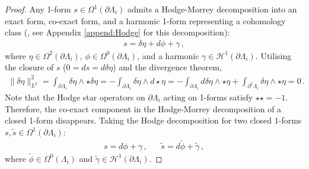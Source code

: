 \documentclass[11pt]{article}
\theoremstyle{plain}
\theoremstyle{definition}
\theoremstyle{remark}
\newcommand{\ST}{\Lambda}
\begin{document}
\begin{proof}

Any 1-form \( s \in \Omega^{1} (\partial \ST_i)\) admits a Hodge-Morrey decomposition into an exact form, co-exact form, and a harmonic 1-form representing a cohomology class (\cite{schwarz-1995}, see Appendix \ref{append:Hodge} for this decomposition):
\begin{align*}
    s = \delta \eta + d \phi + \gamma  \, , %
\end{align*}
where \( \eta \in  \Omega^2 (\partial \ST_i) \), \(\phi \in  \Omega^0 (\partial  \ST_i)\), and a harmonic \(\gamma \in  \mathcal{H}^1(\partial \ST_i)\). Utilising the closure of \(s\) (\(0 = ds = d \delta  \eta\)) and the divergence theorem,
\begin{align*}
    \| \delta  \eta \|^2_{L^2} = \int_{\partial \ST_i} \delta  \eta \wedge \star \delta  \eta
    = -\int_{\partial \ST_i} 
    \delta  \eta \wedge d \star \eta
    = - \int_{\partial \ST_i} 
    d\delta  \eta \wedge  \star \eta
+
\int_{\partial^2 \ST_i} \delta  \eta \wedge  \star \eta = 0 \, . 
\end{align*}
Note that the Hodge star operators on \(\partial \ST_i\) acting on 1-forms satisfy \(\star \star = -1\). Therefore, the co-exact component in the Hodge-Morrey decomposition of a closed 1-form disappears. Taking the Hodge decomposition for two closed \(1\)-forms \(s, \tilde{s} \in \Omega^{1} (\partial \ST_i)\):
\begin{align*}
    s = d \phi + \gamma  \, , & &  \tilde{s} = d \tilde{\phi} + \tilde{\gamma} \, ,
\end{align*}
where \(\tilde{\phi} \in \Omega^0 (\ST_i)\) and \(\tilde{\gamma} \in  \mathcal{H}^1 (\partial \ST_i)\). 


\end{proof}
\end{document}
